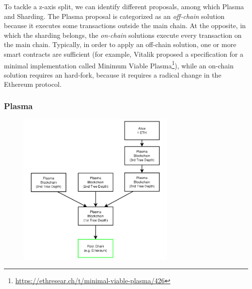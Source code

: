 To tackle a z-axis split, we can identify different proposals, among which
Plasma and Sharding. The Plasma proposal is categorized as an \emph{off-chain}
solution because it executes some transactions outside the main chain. At the
opposite, in which the sharding belongs, the \emph{on-chain} solutions execute
every transaction on the main chain. Typically, in order to apply an off-chain
solution, one or more smart contracts are sufficient (for example, Vitalik
proposed a specification for a minimal implementation called Minimum Viable
Plasma\footnote{\url{https://ethresear.ch/t/minimal-viable-plasma/426}}), while
an on-chain solution requires an hard-fork, because it requires a radical
change in the Ethereum protocol.

\subsubsection{Plasma}

\begin{figure}[t]
    \begin{center}
        \includegraphics[width=0.7\textwidth]{./res/img/plasma}
        \label{fig:plasma}
    \end{center}
\end{figure}

